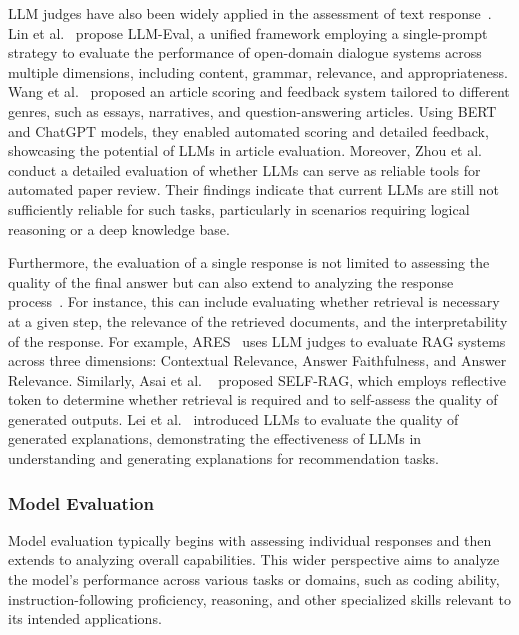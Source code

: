 LLM judges have also been widely applied in the assessment of text response~\cite{lin2023llm,wang2024automated,zhou2024llm}. Lin et al.~\cite{lin2023llm} propose LLM-Eval, a unified framework employing a single-prompt strategy to evaluate the performance of open-domain dialogue systems across multiple dimensions, including content, grammar, relevance, and appropriateness. 
Wang et al.~\cite{wang2024automated} proposed an article scoring and feedback system tailored to different genres, such as essays, narratives, and question-answering articles. Using BERT and ChatGPT models, they enabled automated scoring and detailed feedback, showcasing the potential of LLMs in article evaluation.
Moreover, Zhou et al.~\cite{zhou2024llm} conduct a detailed evaluation of whether LLMs can serve as reliable tools for automated paper review. Their findings indicate that current LLMs are still not sufficiently reliable for such tasks, particularly in scenarios requiring logical reasoning or a deep knowledge base.


Furthermore, the evaluation of a single response is not limited to assessing the quality of the final answer but can also extend to analyzing the response process~\cite{saad2023ares,asai2023self,lei2024recexplainer}. For instance, this can include evaluating whether retrieval is necessary at a given step, the relevance of the retrieved documents, and the interpretability of the response.
For example, ARES~\cite{saad2023ares} uses LLM judges to evaluate RAG systems across three dimensions: Contextual Relevance, Answer Faithfulness, and Answer Relevance. Similarly, Asai et al. ~\cite{asai2023self} proposed SELF-RAG, which employs reflective token to determine whether retrieval is required and to self-assess the quality of generated outputs. Lei et al.~\cite{lei2024recexplainer} introduced LLMs to evaluate the quality of generated explanations, demonstrating the effectiveness of LLMs in understanding and generating explanations for recommendation tasks.




\subsubsection{Model Evaluation}
\label{sec:Model Evaluation}
Model evaluation typically begins with assessing individual responses and then extends to analyzing overall capabilities. This wider perspective aims to analyze the model's performance across various tasks or domains, such as coding ability, instruction-following proficiency, reasoning, and other specialized skills relevant to its intended applications.

